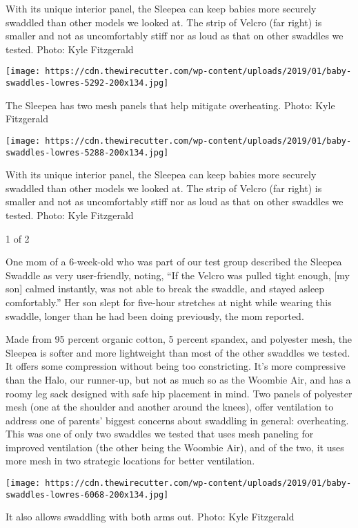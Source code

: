 With its unique interior panel, the Sleepea can keep babies more
securely swaddled than other models we looked at. The strip of Velcro
(far right) is smaller and not as uncomfortably stiff nor as loud as
that on other swaddles we tested. Photo: Kyle Fitzgerald

\texttt{[image: https://cdn.thewirecutter.com/wp-content/uploads/2019/01/baby-swaddles-lowres-5292-200x134.jpg]}

The Sleepea has two mesh panels that help mitigate overheating. Photo:
Kyle Fitzgerald

\texttt{[image: https://cdn.thewirecutter.com/wp-content/uploads/2019/01/baby-swaddles-lowres-5288-200x134.jpg]}

With its unique interior panel, the Sleepea can keep babies more
securely swaddled than other models we looked at. The strip of Velcro
(far right) is smaller and not as uncomfortably stiff nor as loud as
that on other swaddles we tested. Photo: Kyle Fitzgerald

1 of 2

One mom of a 6-week-old who was part of our test group described the
Sleepea Swaddle as very user-friendly, noting, ``If the Velcro was
pulled tight enough, {[}my son{]} calmed instantly, was not able to
break the swaddle, and stayed asleep comfortably.'' Her son slept for
five-hour stretches at night while wearing this swaddle, longer than he
had been doing previously, the mom reported.

Made from 95 percent organic cotton, 5 percent spandex, and polyester
mesh, the Sleepea is softer and more lightweight than most of the other
swaddles we tested. It offers some compression without being too
constricting. It's more compressive than the Halo, our runner-up, but
not as much so as the Woombie Air, and has a roomy leg sack designed
with safe hip placement in mind. Two panels of polyester mesh (one at
the shoulder and another around the knees), offer ventilation to address
one of parents' biggest concerns about swaddling in general:
overheating. This was one of only two swaddles we tested that uses mesh
paneling for improved ventilation (the other being the Woombie Air), and
of the two, it uses more mesh in two strategic locations for better
ventilation.

\texttt{[image: https://cdn.thewirecutter.com/wp-content/uploads/2019/01/baby-swaddles-lowres-6068-200x134.jpg]}

It also allows swaddling with both arms out. Photo: Kyle Fitzgerald

